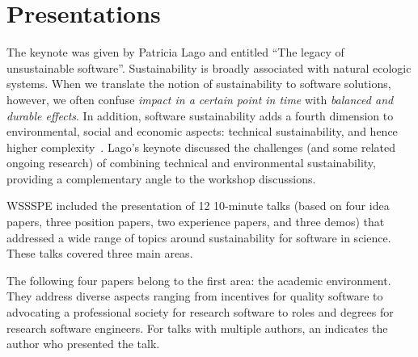 \documentclass[11pt, oneside]{amsart}
\newcommand{\note}[1]{ {\textcolor{blueish}    { ***Note:      #1 }}}
\begin{document}
\section{Presentations}\label{sec:presentations}


The keynote was given by Patricia Lago and entitled ``The legacy of unsustainable software''.
%
Sustainability is broadly associated with natural ecologic systems. When we translate the notion of sustainability to software solutions, however, we often confuse {\em impact in a certain point in time} with {\em balanced and durable effects}. In addition, software sustainability adds a fourth dimension to environmental, social and economic aspects: technical sustainability, and hence higher complexity~\cite{Lago2015}.  Lago's keynote discussed the challenges (and some related ongoing research) of combining technical and environmental sustainability, providing a complementary angle to the workshop discussions.



WSSSPE included the presentation of 12 10-minute talks (based on four idea papers, three position papers,
two experience papers, and three demos) that addressed a wide range of topics around
sustainability for software in science. These talks covered three main areas.

The following four papers belong to the first area: the academic environment.
They address diverse aspects ranging from incentives for quality software to
advocating a professional society for research software to roles and degrees for
research software engineers. For talks with multiple authors, an
\textsuperscript{\textasteriskcentered} indicates the author who presented the talk.
\end{document}
